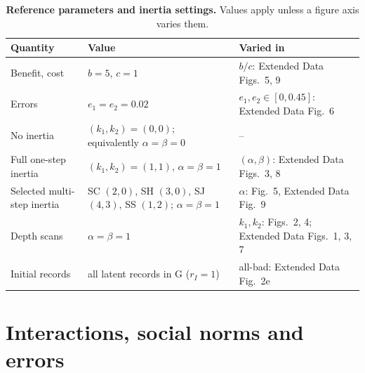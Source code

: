 \documentclass[fleqn,10pt]{article}
\theoremstyle{plain}
\theoremstyle{remark}
\newcommand{\FigRecognition}{2}
\newcommand{\FigDepth}{4}
\newcommand{\FigOpportunism}{5}
\newcommand{\EDRecognition}{1}
\newcommand{\EDResident}{2}
\newcommand{\EDPlanes}{3}
\newcommand{\EDRatio}{5}
\newcommand{\EDErrors}{6}
\newcommand{\EDDepth}{7}
\newcommand{\EDReadout}{8}
\newcommand{\EDSecurity}{9}
\newcommand{\G}{\mathrm G}
\begin{document}
\begin{table}[htbp]
\centering\small
\caption{\textbf{Reference parameters and inertia settings.} Values apply unless a figure axis varies them.}
\label{tab:parameters}
\begin{tabular}{@{}lll@{}}
\toprule
Quantity & Value & Varied in\\
\midrule
Benefit, cost & $b=5$, $c=1$ & $b/c$: Extended Data Figs.~\EDRatio, \EDSecurity\\
Errors & $e_1=e_2=0.02$ & $e_1,e_2\in[0,0.45]$: Extended Data Fig.~\EDErrors\\
No inertia & $(k_1,k_2)=(0,0)$; equivalently $\alpha=\beta=0$ & --\\
Full one-step inertia & $(k_1,k_2)=(1,1)$, $\alpha=\beta=1$ & $(\alpha,\beta)$: Extended Data Figs.~\EDPlanes, \EDReadout\\
Selected multi-step inertia & SC $(2,0)$, SH $(3,0)$, SJ $(4,3)$, SS $(1,2)$; $\alpha=\beta=1$ & $\alpha$: Fig.~\FigOpportunism, Extended Data Fig.~\EDSecurity\\
Depth scans & $\alpha=\beta=1$ & $k_1,k_2$: Figs.~\FigRecognition, \FigDepth; Extended Data Figs.~\EDRecognition, \EDPlanes, \EDDepth\\
Initial records & all latent records in $\G$ ($r_I=1$) & all-bad: Extended Data Fig.~\EDResident e\\
\bottomrule
\end{tabular}
\end{table}

\section{Interactions, social norms and errors}
\label{sec:assessment}
\end{document}
